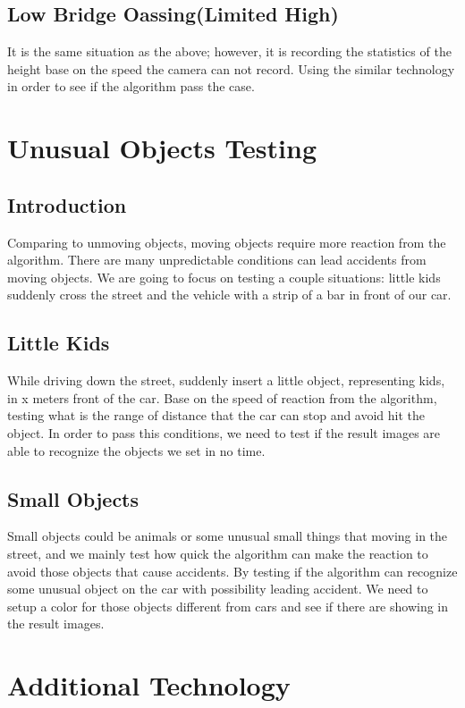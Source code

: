 \documentclass[10pt,draftclsnofoot,onecolumn,journal,compsoc]{IEEEtran}
\begin{document}
\subsection{Low Bridge Oassing(Limited High)}
It is the same situation as the above; however, it is recording the statistics of the height base on the speed the camera can not record.
Using the similar technology in order to see if the algorithm pass the case.



\section{Unusual Objects Testing}
\subsection{Introduction}
Comparing to unmoving objects, moving objects require more reaction from the algorithm. 
There are many unpredictable conditions can lead accidents from moving objects. 
We are going to focus on testing a couple situations: little kids suddenly cross the street and the vehicle with a strip of a bar in front of our car. 

\subsection{Little Kids}
While driving down the street, suddenly insert a little object, representing kids, in x meters front of the car. 
Base on the speed of reaction from the algorithm, testing what is the range of distance that the car can stop and avoid hit the object.
In order to pass this conditions, we need to test if the result images are able to recognize the objects we set in no time.

\subsection{Small Objects}
Small objects could be animals or some unusual small things that moving in the street, and we mainly test how quick the algorithm can make the reaction to avoid those objects that cause accidents.
By testing if the algorithm can recognize some unusual object on the car with possibility leading accident.
We need to setup a color for those objects different from cars and see if there are showing in the result images.

\section{Additional Technology}
\end{document}
